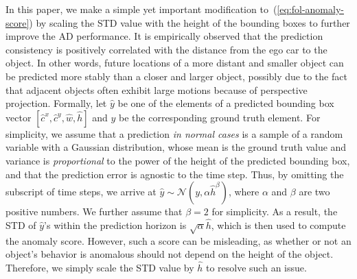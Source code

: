 In this paper, we make a simple yet important modification to~(\ref{eq:fol-anomaly-score}) by scaling the STD value with the height of the bounding boxes to further improve the AD performance. It is empirically observed that the prediction consistency is positively correlated with the distance from the ego car to the object. In other words, future locations of a more distant and smaller object can be predicted more stably than a closer and larger object, possibly due to the fact that adjacent objects often exhibit large motions because of perspective projection. Formally, let $\hat{y}$ be one of the elements of a predicted bounding box vector $[\hat{c}^x, \hat{c}^y, \hat{w}, \hat{h}]$ and $y$ be the corresponding ground truth element. For simplicity, we assume that a prediction \textit{in normal cases} is a sample of a random variable with a Gaussian distribution, whose mean is the ground truth value and variance is \textit{proportional} to the power of the height of the predicted bounding box, and that the prediction error is agnostic to the time step. Thus, by omitting the subscript of time steps, we arrive at $\hat{y} \sim \mathcal{N}(y, \alpha \hat{h}^\beta)$, where $\alpha$ and $\beta$ are two positive numbers. We further assume that $\beta=2$ for simplicity. As a result, the STD of $\hat{y}$'s within the prediction horizon is $\sqrt{\alpha} \hat{h}$, which is then used to compute the anomaly score. However, such a score can be misleading, as whether or not an object's behavior is anomalous should not depend on the height of the object. Therefore, we simply scale the STD value by $\hat{h}$ to resolve such an issue.

